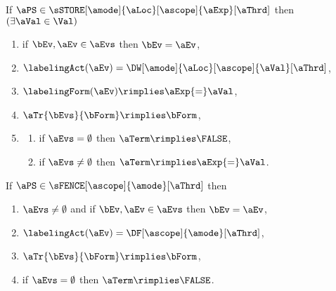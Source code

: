 \begin{definition}
  \noindent
  If $\aPS \in \sSTORE[\amode]{\aLoc}[\ascope]{\aExp}[\aThrd]$ then
  $(\exists\aVal\in\Val)$
  \begin{multicols}{2}
    \begin{enumerate}[topsep=0pt,label=(\textsc{w}\arabic*),ref=\textsc{w}\arabic*]
    \item \label{write-E}
      if $\bEv,\aEv\in\aEvs$ then $\bEv=\aEv$,
    \item \label{write-lambda}
      $\labelingAct(\aEv) = \DW[\amode]{\aLoc}[\ascope]{\aVal}[\aThrd]$,
    \item \label{write-kappa}
      \begin{math}
        \labelingForm(\aEv) \rimplies
        \aExp{=}\aVal
      \end{math},    
    \item \label{write-tau}
      \begin{math}
        \aTr{\bEvs}{\bForm} \rimplies 
        \bForm
      \end{math},
    \item[] \label{write-term}
      \begin{enumerate}[leftmargin=0pt]
      \item \label{write-term-empty}
        if $\aEvs=\emptyset$ then $\aTerm \rimplies \FALSE$,
      \item \label{write-term-nonempty}
        if $\aEvs\neq\emptyset$ then $\aTerm \rimplies \aExp{=}\aVal$.
      \end{enumerate}
    \end{enumerate}
  \end{multicols}
  \medskip

  \noindent
  If $\aPS \in \sFENCE[\ascope]{\amode}[\aThrd]$ then
  \begin{multicols}{2}
    \begin{enumerate}[topsep=0pt,label=(\textsc{f}\arabic*),ref=\textsc{f}\arabic*]
    \item \label{fork-E}
      $\aEvs\neq\emptyset$ and if $\bEv,\aEv\in\aEvs$ then $\bEv=\aEv$,
    \item \label{fork-lambda}
      $\labelingAct(\aEv) = \DF[\ascope]{\amode}[\aThrd]$,
    \item \label{fork-tau}
      $\aTr{\bEvs}{\bForm} \rimplies \bForm$,
    \item \label{fork-term}
      if $\aEvs=\emptyset$ then $\aTerm \rimplies \FALSE$.
    \end{enumerate}
  \end{multicols}
  \medskip


\end{definition}

